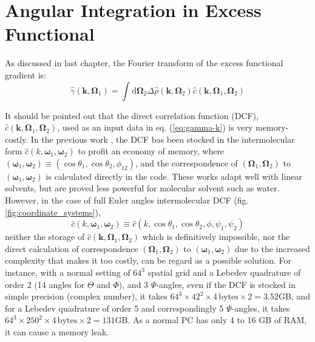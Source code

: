 
\chapter{Angular Integration in Excess Functional \label{chpt:fft-spatial}}

As discussed in last chapter, the Fourier transform of the excess
functional gradient is:
\begin{equation}
\hat{\gamma}(\mathbf{k},\mathbf{\Omega}_{1})=\int\mathrm{d}\mathbf{\Omega}_{2}\Delta\hat{\rho}(\mathbf{k},\mathbf{\Omega}_{2})\hat{c}(\mathbf{k},\mathbf{\Omega}_{1},\mathbf{\Omega}_{2})\label{eq:gamma-k}
\end{equation}

It should be pointed out that the direct correlation function (\acs{DCF}),
$\hat{c}(\mathbf{k},\mathbf{\Omega}_{1},\mathbf{\Omega}_{2})$, used
as an input data in eq. (\ref{eq:gamma-k}) is very memory-costly.
In the previous work \citep{gendre_classical_2009,Zhao_2011,borgis_molecular_2012},
the \acs{DCF} bas been stocked in the intermolecular form $\hat{c}(k,\boldsymbol{\omega}_{1},\boldsymbol{\omega}_{2})$
to profit an economy of memory, where $(\boldsymbol{\omega}_{1},\boldsymbol{\omega}_{2})\equiv(\cos\theta_{1},\cos\theta_{2},\phi_{12})$,
and the correspondence of $(\mathbf{\Omega}_{1},\mathbf{\Omega}_{2})$
to $(\boldsymbol{\omega}_{1},\boldsymbol{\omega}_{2})$ is calculated
directly in the code. These works adapt well with linear solvents,
but are proved less powerful for molecular solvent such as water.
However, in the case of full Euler angles intermolecular \acs{DCF}
(fig. \ref{fig:coordinate_systems}), 
\begin{equation}
\hat{c}(k,\boldsymbol{\omega}_{1},\boldsymbol{\omega}_{2})\equiv\hat{c}(k,\cos\theta_{1},\cos\theta_{2},\phi,\psi_{1},\psi_{2})
\end{equation}
neither the storage of $\hat{c}(\mathbf{k},\mathbf{\Omega}_{1},\mathbf{\Omega}_{2})$
which is definitively impossible, nor the direct calculation of correspondence
$(\mathbf{\Omega}_{1},\mathbf{\Omega}_{2})$ to $(\boldsymbol{\omega}_{1},\boldsymbol{\omega}_{2})$
due to the increased complexity that makes it too costly, can be regard
as a possible solution. For instance, with a normal setting of $64^{3}$
spatial grid and a Lebedev quadrature of order 2 (14 angles for $\Theta$
and $\Phi$), and 3 $\Psi$-angles, even if the \acs{DCF} is stocked
in simple precision (complex number), it takes $64^{3}\times42^{2}\times4\,\mathrm{bytes}\times2=3.52\mathrm{GB}$,
and for a Lebedev quadrature of order 5 and correspondingly 5 $\Psi$-angles,
it takes $64^{3}\times250^{2}\times4\,\mathrm{bytes}\times2=131\mathrm{GB}$.
As a normal PC has only 4 to 16 GB of RAM, it can cause a memory leak. 

